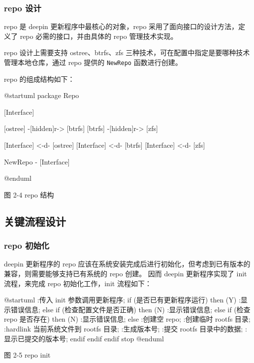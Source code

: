 \documentclass{utart}
\begin{document}
\subsubsection{repo 设计}
repo 是 deepin 更新程序中最核心的对象，repo 采用了面向接口的设计方法，定义了 repo 必需的接口，并由具体的 repo 管理技术实现。

repo 设计上需要支持 ostree、btrfs、zfs 三种技术，可在配置中指定是要哪种技术管理本地仓库，通过 repo 提供的 \texttt{NewRepo} 函数进行创建。

repo 的组成结构如下：
\begin{center}
  \begin{adjustbox}{scale=0.55}
    \begin{plantuml}
      @startuml
      package Repo {
        [Interface]

        [ostree] -[hidden]r-> [btrfs]
        [btrfs] -[hidden]r-> [zfs]

        [Interface] <-d- [ostree]
        [Interface] <-d- [btrfs]
        [Interface] <-d- [zfs]

        NewRepo - [Interface]
      }
      @enduml
    \end{plantuml}
  \end{adjustbox}

  图 2-4 repo 结构
\end{center}

\subsection{关键流程设计}
\subsubsection{repo 初始化}
deepin 更新程序的 repo 应该在系统安装完成后进行初始化，但考虑到已有版本的兼容，则需要能够支持已有系统的 repo 创建。
因而 deepin 更新程序实现了 init 流程，来完成 repo 初始化工作，init 流程如下：
\begin{center}
  \begin{adjustbox}{scale=0.65}
    \begin{plantuml}
      @startuml
      :传入 init 参数调用更新程序;
      if (是否已有更新程序运行) then (Y)
      :显示错误信息;
      else
      if (检查配置文件是否正确) then (N)
      :显示错误信息;
      else
      if (检查 repo 是否存在) then (N)
      :显示错误信息;
      else
      :创建空 repo;
      :创建临时 rootfs 目录;
      :hardlink 当前系统文件到 rootfs 目录;
      :生成版本号;
      :提交 rootfs 目录中的数据;
      :显示已提交的版本号;
      endif
      endif
      endif
      stop
      @enduml
    \end{plantuml}
  \end{adjustbox}

  图 2-5 repo init
\end{center}
\end{document}
